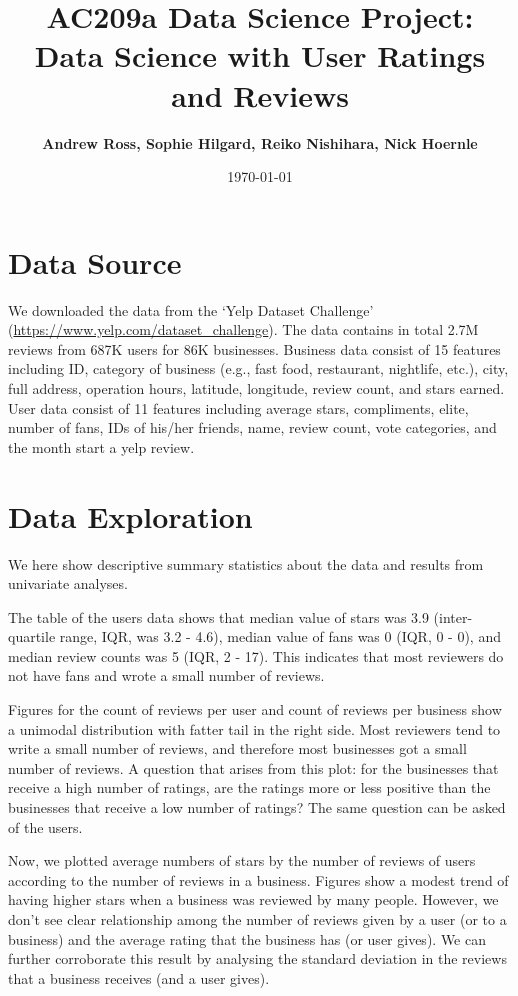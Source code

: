 \documentclass[11pt]{article}
\title{
\vspace{1cm}
\textmd{\textbf{AC209a Data Science Project: Data Science with User Ratings and Reviews}}\\
}
\author{\textbf{Andrew Ross, Sophie Hilgard, Reiko Nishihara, Nick Hoernle}}
\date{\today} %
\begin{document}
\maketitle

\section*{Data Source}
We downloaded the data from the `Yelp Dataset Challenge' (\url{https://www.yelp.com/dataset_challenge}). The data contains in total 2.7M reviews from 687K users for 86K businesses. Business data consist of 15 features including ID, category of business (e.g., fast food, restaurant, nightlife, etc.), city, full address, operation hours, latitude, longitude, review count, and stars earned. User data consist of 11 features including average stars, compliments, elite, number of fans, IDs of his/her friends, name, review count, vote categories, and the month start a yelp review. 

\section*{Data Exploration}
We here show descriptive summary statistics about the data and results from univariate analyses. 

\par The table of the users data shows that median value of stars was 3.9 (inter-quartile range, IQR, was 3.2 - 4.6), median value of fans was 0 (IQR, 0 - 0), and median review counts was 5 (IQR, 2 - 17). This indicates that most reviewers do not have fans and wrote a small number of reviews.

\par Figures for the count of reviews per user and count of reviews per business show a unimodal distribution with fatter tail in the right side. Most reviewers tend to write a small number of reviews, and therefore most businesses got a small number of reviews. A question that arises from this plot: for the businesses that receive a high number of ratings, are the ratings more or less positive than the businesses that receive a low number of ratings? The same question can be asked of the users.

\par Now, we plotted average numbers of stars by the number of reviews of users according to the number of reviews in a business. Figures show a modest trend of having higher stars when a business was reviewed by many people. However, we don't see clear relationship among the number of reviews given by a user (or to a business) and the average rating that the business has (or user gives). We can further corroborate this result by analysing the standard deviation in the reviews that a business receives (and a user gives). 
\end{document}
